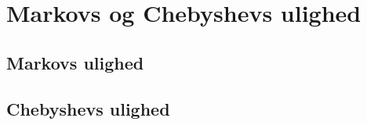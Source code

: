 \section{Markovs og Chebyshevs ulighed}
\subsection{Markovs ulighed}




\subsection{Chebyshevs ulighed}
